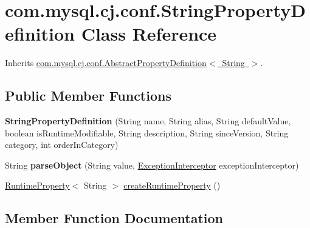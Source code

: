 \hypertarget{classcom_1_1mysql_1_1cj_1_1conf_1_1_string_property_definition}{}\section{com.\+mysql.\+cj.\+conf.\+String\+Property\+Definition Class Reference}
\label{classcom_1_1mysql_1_1cj_1_1conf_1_1_string_property_definition}


Inherits \mbox{\hyperlink{classcom_1_1mysql_1_1cj_1_1conf_1_1_abstract_property_definition}{com.\+mysql.\+cj.\+conf.\+Abstract\+Property\+Definition$<$ String $>$}}.

\subsection*{Public Member Functions}
\begin{DoxyCompactItemize}
\item 
\mbox{\label{classcom_1_1mysql_1_1cj_1_1conf_1_1_string_property_definition_a4347ac471908acdec5b2652266cd54ff}} 
{\bfseries String\+Property\+Definition} (String name, String alias, String default\+Value, boolean is\+Runtime\+Modifiable, String description, String since\+Version, String category, int order\+In\+Category)
\item 
\mbox{\label{classcom_1_1mysql_1_1cj_1_1conf_1_1_string_property_definition_aa532cc6f4673a7c64d941e74c2c23e0e}} 
String {\bfseries parse\+Object} (String value, \mbox{\hyperlink{interfacecom_1_1mysql_1_1cj_1_1exceptions_1_1_exception_interceptor}{Exception\+Interceptor}} exception\+Interceptor)
\item 
\mbox{\hyperlink{interfacecom_1_1mysql_1_1cj_1_1conf_1_1_runtime_property}{Runtime\+Property}}$<$ String $>$ \mbox{\hyperlink{classcom_1_1mysql_1_1cj_1_1conf_1_1_string_property_definition_a1d4bb7606f37440e5eb68b6724647fd1}{create\+Runtime\+Property}} ()
\end{DoxyCompactItemize}


\subsection{Member Function Documentation}
\mbox{\label{classcom_1_1mysql_1_1cj_1_1conf_1_1_string_property_definition_a1d4bb7606f37440e5eb68b6724647fd1}} 
